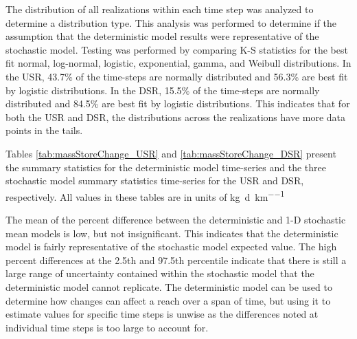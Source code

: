 \begin{linenumbers}
The distribution of all realizations within each time step was analyzed to determine a distribution type.  This analysis was performed to determine if the assumption that the deterministic model results were representative of the stochastic model.  Testing was performed by comparing K-S statistics for the best fit normal, log-normal, logistic, exponential, gamma, and Weibull distributions.  In the USR, 43.7\% of the time-steps are normally distributed and 56.3\% are best fit by logistic distributions.  In the DSR, 15.5\% of the time-steps are normally distributed and 84.5\% are best fit by logistic distributions.  This indicates that for both the USR and DSR, the distributions across the realizations have more data points in the tails.

Tables \ref{tab:massStoreChange_USR} and \ref{tab:massStoreChange_DSR} present the summary statistics for the deterministic model time-series and the three stochastic model summary statistics time-series for the USR and DSR, respectively.  All values in these tables are in units of \si{\kilo\gram\per\day\per\kilo\meter}

\subtabletop
\begin{table}[htbp]
	\centering
	\caption[USR river reach deterministic and stochastic dissolved selenium mass storage change time series summary statistics.]{USR river reach deterministic and stochastic dissolved selenium mass storage change time series summary statistics.  Values are in units of \si{\kilo\gram\per\day\per\kilo\meter}.}
	\label{tab:massStoreChange_USR}
	
\end{table}
\tablevspace
\subtabletop
\begin{table}[htbp]
	\centering
	\caption[DSR river reach deterministic and stochastic dissolved selenium mass storage change time series summary statistics.]{DSR river reach deterministic and stochastic dissolved selenium mass storage change time series summary statistics.  Values are in units of \si{\kilo\gram\per\day\per\kilo\meter}.}
	\label{tab:massStoreChange_DSR}
	
\end{table}

The mean of the percent difference between the deterministic and 1-D stochastic mean models is low, but not insignificant.  This indicates that the deterministic model is fairly representative of the stochastic model expected value.  The high percent differences at the 2.5th and 97.5th percentile indicate that there is still a large range of uncertainty contained within the stochastic model that the deterministic model cannot replicate.  The deterministic model can be used to determine how changes can affect a reach over a span of time, but using it to estimate values for specific time steps is unwise as the differences noted at individual time steps is too large to account for.



\end{linenumbers}
